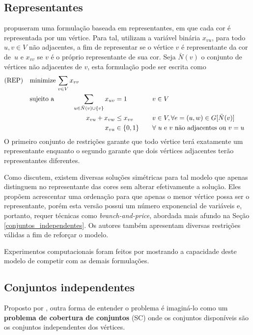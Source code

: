 \documentclass[11pt]{article}
\begin{document}
\subsection{Representantes}
\label{sec:orgd8aa793}
\textcite{Campelo2004CliquesHolesVertex} propuseram uma formulação baseada em representantes, em que cada cor é representada por um vértice.
Para tal, utilizam a variável binária \(x_{vu}\), para todo \(u, v \in V\) não adjacentes, a fim de representar se o vértice \(v\) é representante da cor de~\(u\) e \(x_{vv}\) se \(v\) é o próprio representante de sua cor.
Seja \(\bar{N}(v)\) o conjunto de vértices não adjacentes de \(v\), esta formulação pode ser escrita como
\begin{alignat*}{4}
\mathrm{(REP)} \quad & \omit\rlap{minimize  $\displaystyle \sum_{v \in V} x_{vv}$} \\
& \mbox{sujeito a}&& \quad & \sum_{u \in \bar{N}(v) \cup \{v\}} x_{uv}&= 1        & \quad & v \in V \\
&                 &&   & x_{vu} + x_{vw}    & \leq x_{vv} &   & v \in V, \forall e = (u,w) \in G[\bar{N}(v)] \\
&                 &&   & x_{vu}       & \in \{0,1\} &   & \forall \text{ $u$ e $v$ não adjacentes ou $v = u$}
\end{alignat*}
O primeiro conjunto de restrições garante que todo vértice terá exatamente um representante enquanto o segundo garante que dois vértices adjacentes terão representantes diferentes.

Como \textcite{Campelo2008AsymmetricRepresentativesFormulation} discutem, existem diversas soluções simétricas para tal modelo que apenas distinguem no representante das cores sem alterar efetivamente a solução.
Eles propõem acrescentar uma ordenação para que apenas o menor vértice possa ser o representante, porém esta versão possui um número exponencial de variáveis e, portanto, requer técnicas como \emph{branch-and-price}, abordada mais afundo na Seção \ref{conjuntos_independentes}.
Os autores também apresentam diversas restrições válidas a fim de reforçar o modelo.

Experimentos computacionais foram feitos por \textcite{Jabrayilov2018NewIntegerLinear} mostrando a capacidade deste modelo de competir com as demais formulações.

\subsection{Conjuntos independentes}
\label{sec:orgf501498}
\label{conjuntos_independentes}
Proposto por \textcite{Mehrotra1996ColumnGenerationApproach}, outra forma de entender o problema é imaginá-lo como um \textbf{problema de cobertura de conjuntos} (SC) onde os conjuntos disponíveis são os conjuntos independentes dos vértices.
\end{document}
